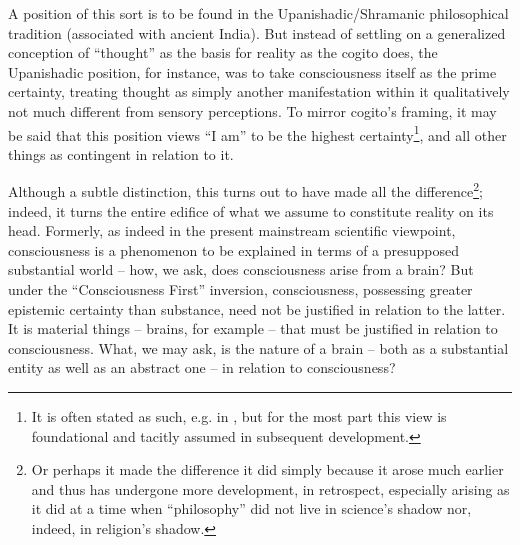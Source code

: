 \documentclass[pra,twocolumn,groupedaddress,10pt]{revtex4}
\theoremstyle{definition}
\begin{document}
A position of this sort is to be found in the Upanishadic/Shramanic philosophical tradition (associated with ancient India). But instead of settling on a generalized conception of ``thought'' as the basis for reality as the cogito does, the Upanishadic position, for instance, was to take consciousness itself as the prime certainty, treating thought as simply another manifestation within it qualitatively not much different from sensory perceptions. To mirror cogito's framing, it may be said that this position views ``I am'' to be the highest certainty\footnote{It is often stated as such, e.g. in \cite{brihadaranyaka}, but for the most part this view is foundational and tacitly assumed in subsequent development.}, and all other things as contingent in relation to it.

Although a subtle distinction, this turns out to have made all the difference\footnote{Or perhaps it made the difference it did simply because it arose much earlier and thus has undergone more development, in retrospect, especially arising as it did at a time when ``philosophy'' did not live in science's shadow nor, indeed, in religion's shadow.}; indeed, it turns the entire edifice of what we assume to constitute reality on its head. Formerly, as indeed in the present mainstream scientific viewpoint, consciousness is a phenomenon to be explained in terms of a presupposed substantial world -- how, we ask, does consciousness arise from a brain? But under the ``Consciousness First'' inversion, consciousness, possessing greater epistemic certainty than substance, need not be justified in relation to the latter. It is material things -- brains, for example -- that must be justified in relation to consciousness. What, we may ask, is the nature of a brain -- both as a substantial entity as well as an abstract one -- in relation to consciousness?
\end{document}
